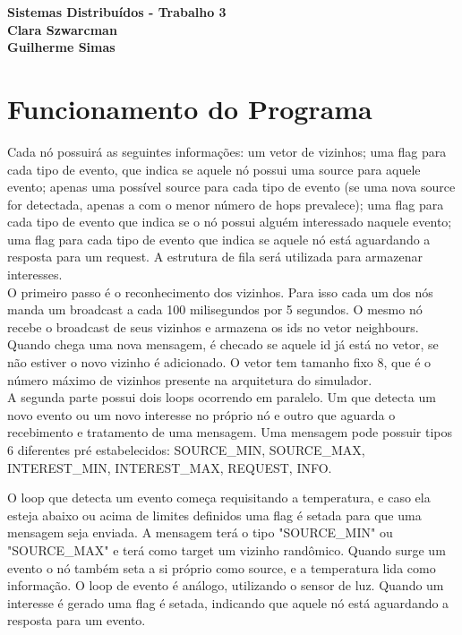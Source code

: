 \documentclass{article}
\begin{document}
\begin{flushleft}
\textbf{\Large{Sistemas Distribuídos - Trabalho 3}}\\
\vspace*{1cm}
\textbf{\large{Clara Szwarcman}}\\
\vspace*{0.25cm}
\textbf{\large{Guilherme Simas}}\\
\end{flushleft}


\section*{Funcionamento do Programa}

	\tab Cada nó possuirá as seguintes informações: um vetor de vizinhos; uma flag para cada tipo de evento, que indica se aquele nó possui uma source para aquele evento; apenas uma possível source para cada tipo de evento (se uma nova source for detectada, apenas a com o menor número de hops prevalece); uma flag para cada tipo de evento que indica se o nó possui alguém interessado naquele evento; uma flag para cada tipo de evento que indica se aquele nó está aguardando a resposta para um request. A estrutura de fila será utilizada para armazenar interesses.\\

	O primeiro passo é o reconhecimento dos vizinhos. Para isso cada um dos nós manda um broadcast a cada 100 milisegundos por 5 segundos. O mesmo nó recebe o broadcast de seus vizinhos e armazena os ids no vetor neighbours. Quando chega uma nova mensagem, é checado se aquele id já está no vetor, se não estiver o novo vizinho é adicionado. O vetor tem tamanho fixo 8, que é o número máximo de vizinhos presente na arquitetura do simulador.\\
	
		A segunda parte possui dois loops ocorrendo em paralelo. Um que detecta um novo evento ou um novo interesse no próprio nó e outro que aguarda o recebimento e tratamento de uma mensagem. Uma mensagem pode possuir tipos 6 diferentes pré estabelecidos: SOURCE\_MIN, SOURCE\_MAX, INTEREST\_MIN, INTEREST\_MAX, REQUEST, INFO. 
		
		O loop que detecta um evento começa requisitando a temperatura, e caso ela esteja abaixo ou acima de limites definidos uma flag é setada para que uma mensagem seja enviada. A mensagem terá o tipo "SOURCE\_MIN" ou "SOURCE\_MAX" e terá como target um vizinho randômico. Quando surge um evento o nó também seta a si próprio como source, e a temperatura lida como informação. O loop de evento é análogo, utilizando o sensor de luz. Quando um interesse é gerado uma flag é setada, indicando que aquele nó está aguardando a resposta para um evento.\\
		
\end{document}
